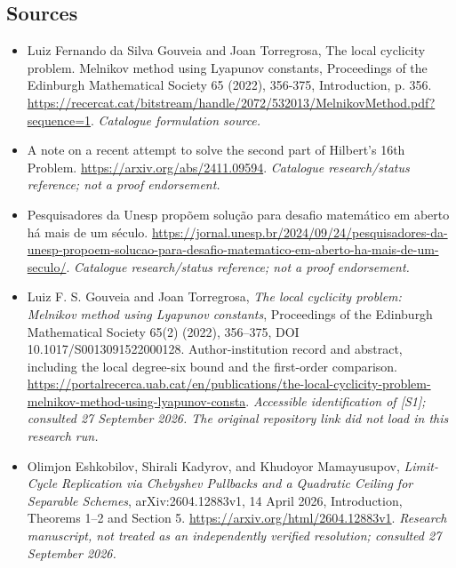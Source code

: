 \documentclass[11pt,a4paper]{article}
\numberwithin{equation}{section}
\begin{document}
\subsection{Sources}
\begin{itemize}\raggedright
\item[\textnormal{[S1]}]\hypertarget{source:1162:1}{} Luiz Fernando da Silva Gouveia and Joan Torregrosa, The local cyclicity problem. Melnikov method using Lyapunov constants, Proceedings of the Edinburgh Mathematical Society 65 (2022), 356-375, Introduction, p. 356.
\url{https://recercat.cat/bitstream/handle/2072/532013/MelnikovMethod.pdf?sequence=1}.
{\small\textit{Catalogue formulation source.}}
\item[\textnormal{[S2]}]\hypertarget{source:1162:2}{} A note on a recent attempt to solve the second part of Hilbert's 16th Problem.
\url{https://arxiv.org/abs/2411.09594}.
{\small\textit{Catalogue research/status reference; not a proof endorsement.}}
\item[\textnormal{[S3]}]\hypertarget{source:1162:3}{} Pesquisadores da Unesp propõem solução para desafio matemático em aberto há mais de um século.
\url{https://jornal.unesp.br/2024/09/24/pesquisadores-da-unesp-propoem-solucao-para-desafio-matematico-em-aberto-ha-mais-de-um-seculo/}.
{\small\textit{Catalogue research/status reference; not a proof endorsement.}}
\item[\textnormal{[E1]}]\hypertarget{extra:1162:1}{} Luiz F. S. Gouveia and Joan Torregrosa,
\emph{The local cyclicity problem: Melnikov method using Lyapunov constants},
Proceedings of the Edinburgh Mathematical Society 65(2) (2022), 356--375,
DOI 10.1017/S0013091522000128. Author-institution record and abstract,
including the local degree-six bound and the first-order comparison.
\url{https://portalrecerca.uab.cat/en/publications/the-local-cyclicity-problem-melnikov-method-using-lyapunov-consta}.
{\small\textit{Accessible identification of [S1]; consulted 27 September 2026.
The original repository link did not load in this research run.}}
\item[\textnormal{[E2]}]\hypertarget{extra:1162:2}{} Olimjon Eshkobilov, Shirali Kadyrov,
and Khudoyor Mamayusupov, \emph{Limit-Cycle Replication via Chebyshev Pullbacks
and a Quadratic Ceiling for Separable Schemes}, arXiv:2604.12883v1,
14 April 2026, Introduction, Theorems 1--2 and Section 5.
\url{https://arxiv.org/html/2604.12883v1}.
{\small\textit{Research manuscript, not treated as an independently verified
resolution; consulted 27 September 2026.}}
\end{itemize}
\end{document}
